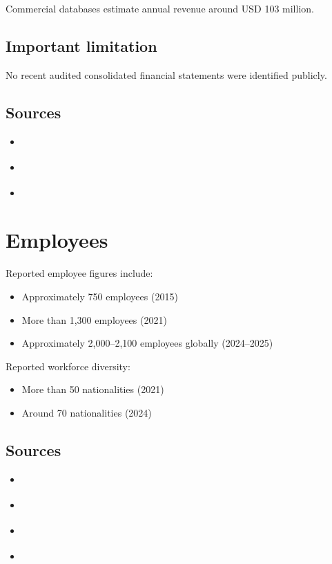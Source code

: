 Commercial databases estimate annual revenue around USD 103 million.

\subsection*{Important limitation}

No recent audited consolidated financial statements were identified publicly.

\subsection*{Sources}

\begin{itemize}
    \item \cite{wikipediaLaederach}
    \item \cite{laderach200thChocolaterie2024}
    \item \cite{prospeoLaederachRevenue}
\end{itemize}

\section{Employees}

Reported employee figures include:

\begin{itemize}
    \item Approximately 750 employees (2015)
    \item More than 1,300 employees (2021)
    \item Approximately 2,000--2,100 employees globally (2024--2025)
\end{itemize}

Reported workforce diversity:

\begin{itemize}
    \item More than 50 nationalities (2021)
    \item Around 70 nationalities (2024)
\end{itemize}

\subsection*{Sources}

\begin{itemize}
    \item \cite{wikipediaLaederach}
    \item \cite{laderachLeadershipNextGeneration}
    \item \cite{hrCampusLaederachSwitzerland}
    \item \cite{laderachBestManaged2024}
\end{itemize}

